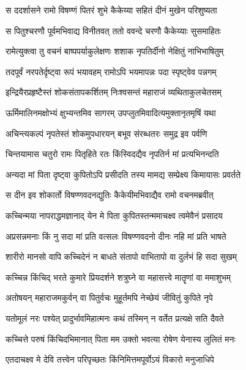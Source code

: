 
\twolineshloka
{स ददर्शासने रामो विषण्णं पितरं शुभे}
{कैकेय्या सहितं दीनं मुखेन परिशुष्यता} %

\twolineshloka
{स पितुश्चरणौ पूर्वमभिवाद्य विनीतवत्}
{ततो ववन्दे चरणौ कैकेय्याः सुसमाहितः} %

\twolineshloka
{रामेत्युक्त्वा तु वचनं बाष्पपर्याकुलेक्षणः}
{शशाक नृपतिर्दीनो नेक्षितुं नाभिभाषितुम्} %

\twolineshloka
{तदपूर्वं नरपतेर्दृष्ट्वा रूपं भयावहम्}
{रामोऽपि भयमापन्नः पदा स्पृष्ट्वेव पन्नगम्} %

\twolineshloka
{इन्द्रियैरप्रहृष्टैस्तं शोकसंतापकर्शितम्}
{निःश्वसन्तं महाराजं व्यथिताकुलचेतसम्} %

\twolineshloka
{ऊर्मिमालिनमक्षोभ्यं क्षुभ्यन्तमिव सागरम्}
{उपप्लुतमिवादित्यमुक्तानृतमृषिं यथा} %

\twolineshloka
{अचिन्त्यकल्पं नृपतेस्तं शोकमुपधारयन्}
{बभूव संरब्धतरः समुद्र इव पर्वणि} %

\twolineshloka
{चिन्तयामास चतुरो रामः पितृहिते रतः}
{किंस्विदद्यैव नृपतिर्न मां प्रत्यभिनन्दति} %

\twolineshloka
{अन्यदा मां पिता दृष्ट्वा कुपितोऽपि प्रसीदति}
{तस्य मामद्य सम्प्रेक्ष्य किमायासः प्रवर्तते} %

\twolineshloka
{स दीन इव शोकार्तो विषण्णवदनद्युतिः}
{कैकेयीमभिवाद्यैव रामो वचनमब्रवीत्} %

\twolineshloka
{कच्चिन्मया नापराद्धमज्ञानाद् येन मे पिता}
{कुपितस्तन्ममाचक्ष्व त्वमेवैनं प्रसादय} %

\twolineshloka
{अप्रसन्नमनाः किं नु सदा मां प्रति वत्सलः}
{विषण्णवदनो दीनः नहि मां प्रति भाषते} %

\twolineshloka
{शारीरो मानसो वापि कच्चिदेनं न बाधते}
{संतापो वाभितापो वा दुर्लभं हि सदा सुखम्} %

\twolineshloka
{कच्चिन्न किंचिद् भरते कुमारे प्रियदर्शने}
{शत्रुघ्ने वा महासत्त्वे मातॄणां वा ममाशुभम्} %

\twolineshloka
{अतोषयन् महाराजमकुर्वन् वा पितुर्वचः}
{मुहूर्तमपि नेच्छेयं जीवितुं कुपिते नृपे} %

\twolineshloka
{यतोमूलं नरः पश्येत् प्रादुर्भावमिहात्मनः}
{कथं तस्मिन् न वर्तेत प्रत्यक्षे सति दैवते} %

\twolineshloka
{कच्चित्ते परुषं किंचिदभिमानात् पिता मम}
{उक्तो भवत्या रोषेण येनास्य लुलितं मनः} %

\twolineshloka
{एतदाचक्ष्व मे देवि तत्त्वेन परिपृच्छतः}
{किंनिमित्तमपूर्वोऽयं विकारो मनुजाधिपे} %

